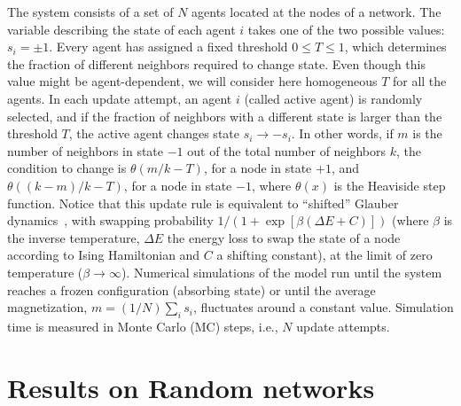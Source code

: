 The system consists of a set of $N$ agents located at the nodes of a network. The variable describing the state of each agent $i$ takes one of the two possible values: $s_i = \pm 1$. Every agent has assigned a fixed threshold $0 \leq T \leq 1$, which determines the fraction of different neighbors required to change state. Even though this value might be agent-dependent, we will consider here homogeneous $T$ for all the agents. In each update attempt, an agent $i$ (called active agent) is randomly selected, and if the fraction of neighbors with a different state is larger than the threshold $T$, the active agent changes state $s_i \to -s_i$. In other words, if $m$ is the number of neighbors in state $-1$ out of the total number of neighbors $k$, the condition to change is $\theta(m/k - T)$, for a node in state $+1$, and $\theta((k-m)/k - T)$, for a node in state $-1$, where $\theta(x)$ is the Heaviside step function. Notice that this update rule is equivalent to ``shifted'' Glauber dynamics~\cite{glauber1963time}, with swapping probability $1/(1+\exp[\beta(\Delta E + C)])$ (where $\beta$ is the inverse temperature, $\Delta E$ the energy loss to swap the state of a node according to Ising Hamiltonian and $C$ a shifting constant), at the limit of zero temperature ($\beta \to \infty$). Numerical simulations of the model run until the system reaches a frozen configuration (absorbing state) or until the average magnetization, $m = (1/N) \sum_i s_i$, fluctuates around a constant value.   Simulation time is measured in Monte Carlo (MC) steps, i.e., $N$ update attempts. 

\section{\label{sec:Results on Complex networks} Results on Random networks}

